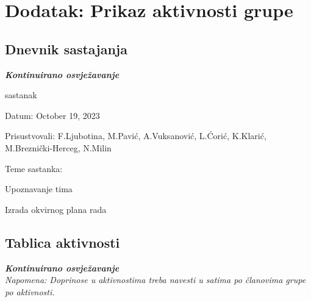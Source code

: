 \chapter*{Dodatak: Prikaz aktivnosti grupe}
		
		\section*{Dnevnik sastajanja}
		
		\textbf{\textit{Kontinuirano osvježavanje}}\\
		
		\begin{packed_enum}
			\item  sastanak
			
			\item[] \begin{packed_item}
				\item Datum: October 19, 2023
				\item Prisustvovali: F.Ljubotina, M.Pavić, A.Vuksanović, L.Ćorić, K.Klarić, M.Breznički-Herceg, N.Milin
				\item Teme sastanka:
				\begin{packed_item}
					\item  Upoznavanje tima 
					\item  Izrada okvirnog plana rada
				\end{packed_item}
			\end{packed_item}
			
			
		\end{packed_enum}
		
		\eject
		\section*{Tablica aktivnosti}
		
			\textbf{\textit{Kontinuirano osvježavanje}}\\
			
			 \textit{Napomena: Doprinose u aktivnostima treba navesti u satima po članovima grupe po aktivnosti.}

